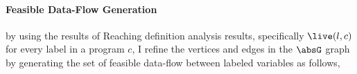 \paragraph{Feasible Data-Flow Generation}
by using the results of Reaching definition analysis results, specifically $\live(l, c)$ for every label in a program $c$, I refine the vertices and edges in the $\absG$ graph 
by generating the set of feasible data-flow between labeled variables as follows,
%
%
